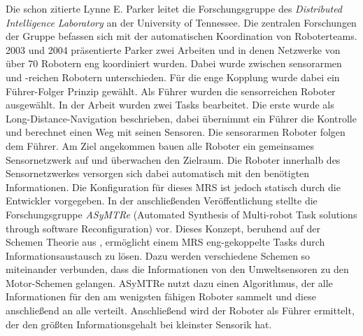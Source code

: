 
Die schon zitierte Lynne E. Parker leitet die Forschungsgruppe des \textit{Distributed Intelligence Laboratory} an der University of Tennessee. Die zentralen Forschungen der Gruppe befassen sich mit der automatischen Koordination von Roboterteams. 2003 und 2004 präsentierte Parker zwei Arbeiten \cite{parker2003effect} und \cite{parker2004tightly} in denen Netzwerke von über 70 Robotern eng koordiniert wurden. Dabei wurde zwischen sensorarmen und -reichen Robotern unterschieden. Für die enge Kopplung wurde dabei ein Führer-Folger Prinzip gewählt. Als Führer wurden die sensorreichen Roboter ausgewählt. In der Arbeit wurden zwei Tasks bearbeitet. Die erste wurde als Long-Distance-Navigation beschrieben, dabei übernimmt ein Führer die Kontrolle und berechnet einen Weg mit seinen Sensoren. Die sensorarmen Roboter folgen dem Führer. Am Ziel angekommen bauen alle Roboter ein gemeinsames Sensornetzwerk auf und überwachen den Zielraum. Die Roboter innerhalb des Sensornetzwerkes versorgen sich dabei automatisch mit den benötigten Informationen. Die Konfiguration für dieses MRS ist jedoch statisch durch die Entwickler vorgegeben. In der anschließenden Veröffentlichung \cite{parker2005enabling} stellte die Forschungsgruppe \textit{ASyMTRe} (Automated Synthesis of Multi-robot Task solutions through software Reconfiguration) vor. Dieses Konzept, beruhend auf der Schemen Theorie aus \cite{arkin1987motor}, ermöglicht einem MRS eng-gekoppelte Tasks durch Informationsaustausch zu lösen. Dazu werden verschiedene Schemen so miteinander verbunden, dass die Informationen von den Umweltsensoren zu den Motor-Schemen gelangen. ASyMTRe nutzt dazu einen Algorithmus, der alle Informationen für den am wenigsten fähigen Roboter sammelt und diese anschließend an alle verteilt. Anschließend wird der Roboter als Führer ermittelt, der den größten Informationsgehalt bei kleinster Sensorik hat.\cite{lundh2006plan} 

